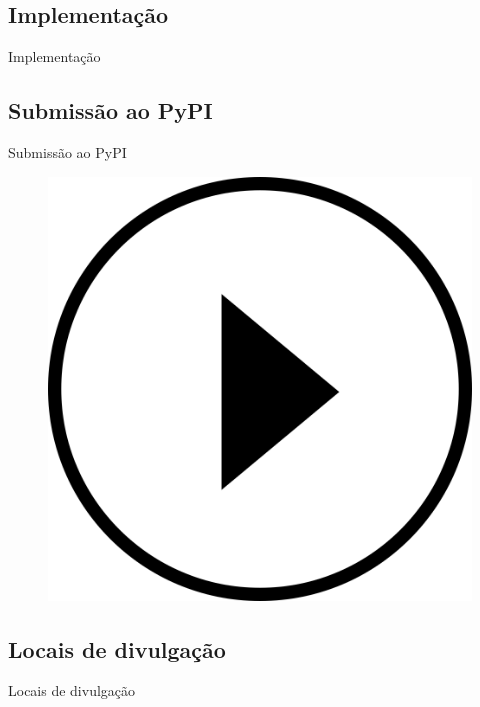 \subsection{Implementação}
\label{ss.implementation}

\begin{frame}{Implementação}
\end{frame}

\subsection{Submissão ao PyPI}
\label{ss.pypi_submission}

\begin{frame}{Submissão ao PyPI}
\end{frame}

\begin{frame}{}
	\begin{figure}
		\centering
		\includegraphics[scale=0.125]{figs/video_play.png}
	\end{figure}
\end{frame}

\subsection{Locais de divulgação}
\label{ss.places_sharing}

\begin{frame}{Locais de divulgação}
\end{frame}